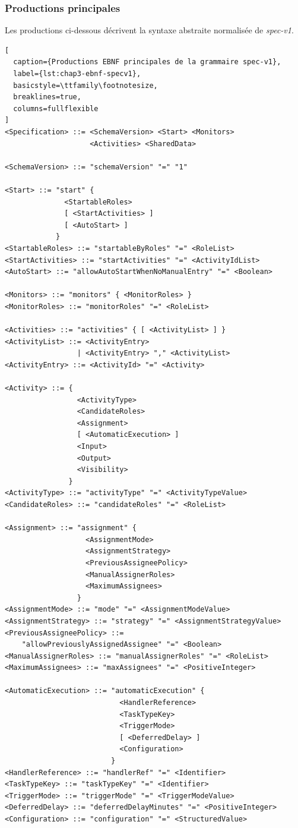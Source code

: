 \subsubsection*{Productions principales}

Les productions ci-dessous décrivent la syntaxe abstraite normalisée de \textit{spec-v1}.
\begin{lstlisting}[
  caption={Productions EBNF principales de la grammaire spec-v1},
  label={lst:chap3-ebnf-specv1},
  basicstyle=\ttfamily\footnotesize,
  breaklines=true,
  columns=fullflexible
]
<Specification> ::= <SchemaVersion> <Start> <Monitors>
                    <Activities> <SharedData>

<SchemaVersion> ::= "schemaVersion" "=" "1"

<Start> ::= "start" {
              <StartableRoles>
              [ <StartActivities> ]
              [ <AutoStart> ]
            }
<StartableRoles> ::= "startableByRoles" "=" <RoleList>
<StartActivities> ::= "startActivities" "=" <ActivityIdList>
<AutoStart> ::= "allowAutoStartWhenNoManualEntry" "=" <Boolean>

<Monitors> ::= "monitors" { <MonitorRoles> }
<MonitorRoles> ::= "monitorRoles" "=" <RoleList>

<Activities> ::= "activities" { [ <ActivityList> ] }
<ActivityList> ::= <ActivityEntry>
                 | <ActivityEntry> "," <ActivityList>
<ActivityEntry> ::= <ActivityId> "=" <Activity>

<Activity> ::= {
                 <ActivityType>
                 <CandidateRoles>
                 <Assignment>
                 [ <AutomaticExecution> ]
                 <Input>
                 <Output>
                 <Visibility>
               }
<ActivityType> ::= "activityType" "=" <ActivityTypeValue>
<CandidateRoles> ::= "candidateRoles" "=" <RoleList>

<Assignment> ::= "assignment" {
                   <AssignmentMode>
                   <AssignmentStrategy>
                   <PreviousAssigneePolicy>
                   <ManualAssignerRoles>
                   <MaximumAssignees>
                 }
<AssignmentMode> ::= "mode" "=" <AssignmentModeValue>
<AssignmentStrategy> ::= "strategy" "=" <AssignmentStrategyValue>
<PreviousAssigneePolicy> ::=
    "allowPreviouslyAssignedAssignee" "=" <Boolean>
<ManualAssignerRoles> ::= "manualAssignerRoles" "=" <RoleList>
<MaximumAssignees> ::= "maxAssignees" "=" <PositiveInteger>

<AutomaticExecution> ::= "automaticExecution" {
                           <HandlerReference>
                           <TaskTypeKey>
                           <TriggerMode>
                           [ <DeferredDelay> ]
                           <Configuration>
                         }
<HandlerReference> ::= "handlerRef" "=" <Identifier>
<TaskTypeKey> ::= "taskTypeKey" "=" <Identifier>
<TriggerMode> ::= "triggerMode" "=" <TriggerModeValue>
<DeferredDelay> ::= "deferredDelayMinutes" "=" <PositiveInteger>
<Configuration> ::= "configuration" "=" <StructuredValue>


\end{lstlisting}
